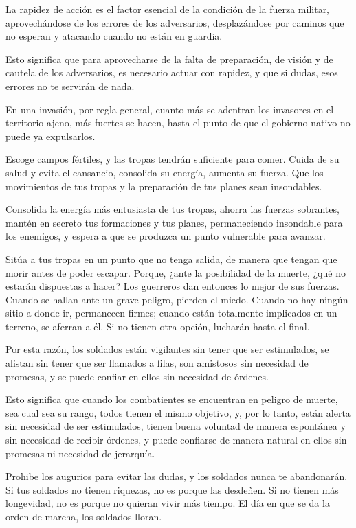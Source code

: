 La rapidez de acción es el factor esencial de la condición de la fuerza militar, aprovechándose de los errores de los adversarios, desplazándose por caminos que no esperan y atacando cuando no están en guardia.

Esto significa que para aprovecharse de la falta de preparación, de visión y de cautela de los adversarios, es necesario actuar con rapidez, y que si dudas, esos errores no te servirán de nada.

En una invasión, por regla general, cuanto más se adentran los invasores en el territorio ajeno, más fuertes se hacen, hasta el punto de que el gobierno nativo no puede ya expulsarlos.

Escoge campos fértiles, y las tropas tendrán suficiente para comer. Cuida de su salud y evita el cansancio, consolida su energía, aumenta su fuerza. Que los movimientos de tus tropas y la preparación de tus planes sean insondables.

Consolida la energía más entusiasta de tus tropas, ahorra las fuerzas sobrantes, mantén en secreto tus formaciones y tus planes, permaneciendo insondable para los enemigos, y espera a que se produzca un punto vulnerable para avanzar.

Sitúa a tus tropas en un punto que no tenga salida, de manera que tengan que morir antes de poder escapar. Porque, ¿ante la posibilidad de la muerte, ¿qué no estarán dispuestas a hacer? Los guerreros dan entonces lo mejor de sus fuerzas. Cuando se hallan ante un grave peligro, pierden el miedo. Cuando no hay ningún sitio a donde ir, permanecen firmes; cuando están totalmente implicados en un terreno, se aferran a él. Si no tienen otra opción, lucharán hasta el final.

Por esta razón, los soldados están vigilantes sin tener que ser estimulados, se alistan sin tener que ser llamados a filas, son amistosos sin necesidad de promesas, y se puede confiar en ellos sin necesidad de órdenes.

Esto significa que cuando los combatientes se encuentran en peligro de muerte, sea cual sea su rango, todos tienen el mismo objetivo, y, por lo tanto, están alerta sin necesidad de ser estimulados, tienen buena voluntad de manera espontánea y sin necesidad de recibir órdenes, y puede confiarse de manera natural en ellos sin promesas ni necesidad de jerarquía.

Prohibe los augurios para evitar las dudas, y los soldados nunca te abandonarán. Si tus soldados no tienen riquezas, no es porque las desdeñen. Si no tienen más longevidad, no es porque no quieran vivir más tiempo. El día en que se da la orden de marcha, los soldados lloran.

